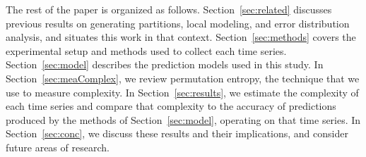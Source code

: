 

The rest of the paper is organized as follows.
Section~\ref{sec:related} discusses previous results on generating
partitions, local modeling, and error distribution analysis, and
situates this work in that context. Section~\ref{sec:methods} covers
the experimental setup and methods used to collect each time
series. Section~\ref{sec:model} describes the prediction models used
in this study.  In Section~\ref{sec:meaComplex}, we review permutation
entropy, the technique that we use to measure complexity.  In
Section~\ref{sec:results}, we estimate the complexity of each time
series and compare that complexity to the accuracy of predictions
produced by the methods of Section~\ref{sec:model}, operating on that
time series.  In Section~\ref{sec:conc}, we discuss these results and
their implications, and consider future areas of research.


